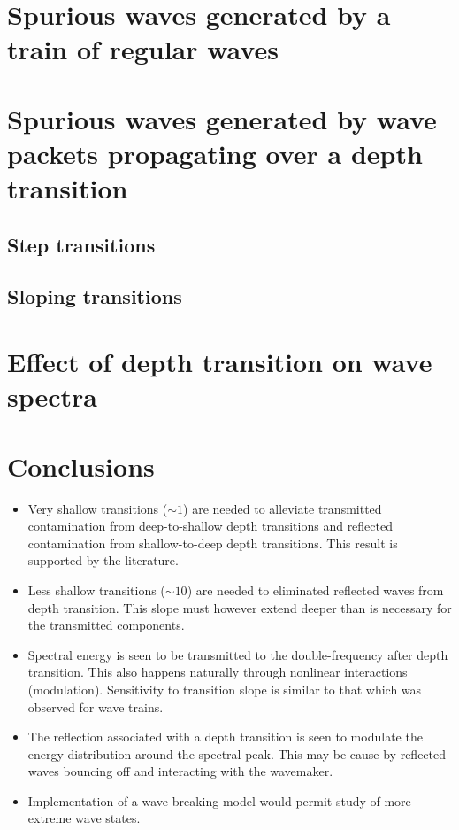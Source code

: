\documentclass[internal]{sintefmemo}
\begin{document}
\section{Spurious waves generated by a train of regular waves}
\label{sec:train}




\section{Spurious waves generated by wave packets propagating over a depth transition}

\subsection{Step transitions}
\label{sec:packetStep}
 

\subsection{Sloping transitions}
\label{sec:packetSlope}



\section{Effect of depth transition on wave spectra}
\label{sec:spectra}

 
\section{Conclusions}
\begin{itemize}
	\item Very shallow transitions ($\sim 1$\textdegree{}) are needed to alleviate transmitted contamination from deep-to-shallow depth transitions and reflected contamination from shallow-to-deep depth transitions.
	This result is supported by the literature.
	\item Less shallow transitions ($\sim 10$\textdegree{}) are needed to eliminated reflected waves from depth transition. This slope must however extend deeper than is necessary for the transmitted components. 
	\item Spectral energy is seen to be transmitted to the double-frequency after depth transition. This also happens naturally through nonlinear interactions (modulation). Sensitivity to transition slope is similar to that which was observed for wave trains.
	\item The reflection associated with a depth transition is seen to modulate the energy distribution around the spectral peak. This may be cause by reflected waves bouncing off and interacting with the wavemaker.
	\item Implementation of a wave breaking model would permit study of more extreme wave states.
\end{itemize}



\end{document}
